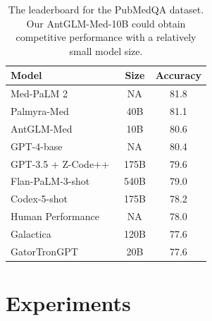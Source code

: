\documentclass{article} %
\begin{document}
\begin{table}[!t]
\centering
\label{lead_pubmedqa}
\caption{The leaderboard for the PubMedQA dataset. Our AntGLM-Med-10B could obtain competitive performance with a relatively small model size.}
\begin{tabular}{lcc}
\toprule
Model                                                                            & Size & Accuracy \\ \midrule
Med-PaLM 2~\citep{singhal2023expertlevel}                                         & NA   & 81.8     \\
Palmyra-Med~\citep{kamble2023palmyra}                                                  & 40B  & 81.1     \\
\color{red} AntGLM-Med                                                                               & \color{red}10B   & \color{red}80.6 \\
GPT-4-base~\citep{nori2023capabilities}                                                & NA   & 80.4     \\
GPT-3.5 + Z-Code++~\citep{he2023zcode}                                        & 175B & 79.6     \\
Flan-PaLM-3-shot~\citep{singhal2022large}                                   & 540B & 79.0     \\
Codex-5-shot~\citep{liévin2023large} & 175B & 78.2     \\
Human Performance~\citep{jin-etal-2019-pubmedqa}       & NA   & 78.0     \\
Galactica~\citep{taylor2022galactica}                                                           & 120B & 77.6     \\
GatorTronGPT~\citep{peng2023study}                                   & 20B  & 77.6    \\ \bottomrule
\end{tabular}
\end{table}


\section{Experiments}
\label{experiment}
\end{document}
